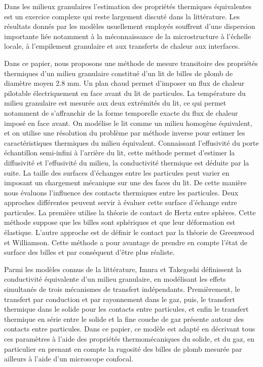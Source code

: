 {\normalsize
Dans les milieux granulaires l'estimation des propriétés thermiques équivalentes est un exercice complexe qui reste largement discuté dans la littérature. Les résultats donnés par les modèles usuellement employés souffrent d'une dispersion importante liée notamment à la méconnaissance de la microstructure à l'échelle locale, à l'empilement granulaire et aux transferts de chaleur aux interfaces.







Dans ce papier, nous proposons une méthode de mesure transitoire des propriétés thermiques d'un milieu granulaire constitué d'un lit de billes de plomb de diamètre moyen 2.8 mm. Un plan chaud permet d'imposer un flux de chaleur pilotable électriquement en face avant du lit de particules.  La température du milieu granulaire est mesurée aux deux extrémités du lit, ce qui permet notamment de s'affranchir de la forme temporelle exacte du flux de chaleur imposé en face avant. On modélise le lit comme un milieu homogène équivalent, et on utilise une résolution du problème par méthode inverse pour estimer les caractéristiques thermiques du milieu équivalent. Connaissant l'effusivité du porte échantillon semi-infini à l'arrière du lit, cette méthode permet d'estimer la diffusivité et l'effusivité du milieu, la conductivité thermique est déduite par la suite. La taille des surfaces d'échanges entre les particules peut varier  en imposant un chargement mécanique sur une des faces du lit. De cette manière nous évaluons l'influence des contacts thermiques entre les particules. Deux approches différentes peuvent servir à évaluer cette surface d'échange entre particules. La première utilise la théorie de contact de Hertz entre sphères. Cette méthode suppose que les billes sont sphériques et que leur déformation est élastique. L'autre approche est de définir le contact par la théorie de Greenwood et Williamson. Cette méthode a pour avantage de prendre en compte l'état de surface  des billes et par conséquent d'être plus réaliste.







Parmi les modèles connus de la littérature, Imura et Takegoshi définissent la conductivité équivalente d'un milieu granulaire, en modélisant les effets simultanés de trois mécanismes de transfert indépendants. Premièrement, le transfert par conduction et par rayonnement dans le gaz, puis, le transfert thermique dans le solide pour les contacts entre particules, et enfin le transfert thermique en série entre le solide et la fine couche de gaz présente autour des contacts entre particules. Dans ce papier, ce modèle est adapté en décrivant tous ces paramètres à l'aide des propriétés thermomécaniques du solide, et du gaz, en particulier en prenant en compte la rugosité des billes de plomb mesurée par ailleurs à l'aide d'un microscope confocal. 



}
